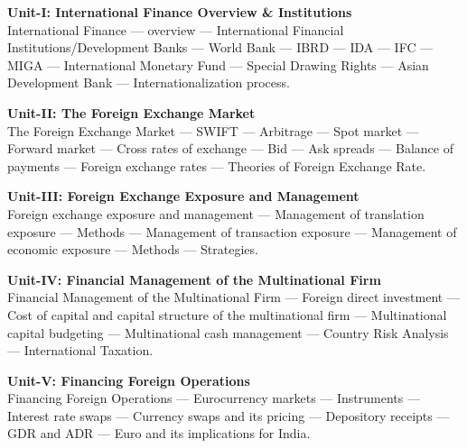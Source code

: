 \vspace{0.2em}
\noindent\textbf{Unit-I: International Finance Overview \& Institutions}\\
\footnotesize
International Finance --- overview --- International Financial Institutions/Development Banks --- World Bank --- IBRD --- IDA --- IFC --- MIGA --- International Monetary Fund --- Special Drawing Rights --- Asian Development Bank --- Internationalization process.
\normalsize

\vspace{0.2em}
\noindent\textbf{Unit-II: The Foreign Exchange Market}\\
\footnotesize
The Foreign Exchange Market --- SWIFT --- Arbitrage --- Spot market --- Forward market --- Cross rates of exchange --- Bid --- Ask spreads --- Balance of payments --- Foreign exchange rates --- Theories of Foreign Exchange Rate.
\normalsize

\vspace{0.2em}
\noindent\textbf{Unit-III: Foreign Exchange Exposure and Management}\\
\footnotesize
Foreign exchange exposure and management --- Management of translation exposure --- Methods --- Management of transaction exposure --- Management of economic exposure --- Methods --- Strategies.
\normalsize

\vspace{0.2em}
\noindent\textbf{Unit-IV: Financial Management of the Multinational Firm}\\
\footnotesize
Financial Management of the Multinational Firm --- Foreign direct investment --- Cost of capital and capital structure of the multinational firm --- Multinational capital budgeting --- Multinational cash management --- Country Risk Analysis --- International Taxation.
\normalsize

\vspace{0.2em}
\noindent\textbf{Unit-V: Financing Foreign Operations}\\
\footnotesize
Financing Foreign Operations --- Eurocurrency markets --- Instruments --- Interest rate swaps --- Currency swaps and its pricing --- Depository receipts --- GDR and ADR --- Euro and its implications for India.
\normalsize


